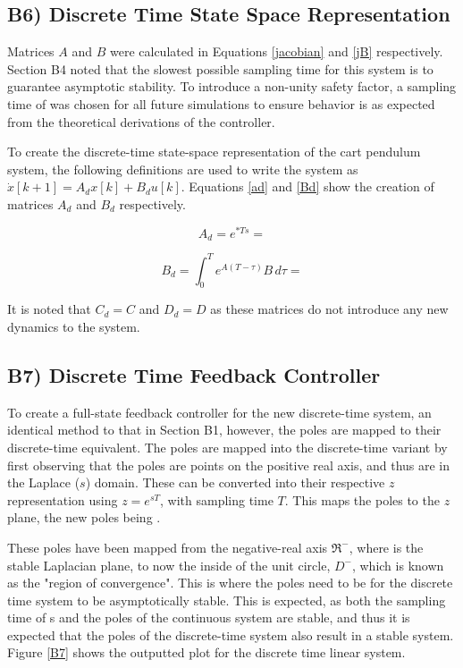 \documentclass{article}
\begin{document}
\subsection*{B6) Discrete Time State Space Representation}
Matrices $A$ and $B$ were calculated in Equations \ref{jacobian} and \ref{jB} respectively. Section B4 noted that the slowest possible sampling time for this system is to guarantee asymptotic stability. To introduce a non-unity safety factor, a sampling time of  was chosen for all future simulations to ensure behavior is as expected from the theoretical derivations of the controller.

To create the discrete-time state-space representation of the cart pendulum system, the following definitions are used to write the system as $\dot x[k+1]=A_dx[k]+B_du[k]$. Equations \ref{ad} and \ref{Bd} show the creation of matrices $A_d$ and $B_d$ respectively.

\begin{equation}\label{ad}
    A_d=e^{*Ts}=
\end{equation}


\begin{equation}\label{Bd}
    B_d=\int_{0}^{T} e^{A(T - \tau)} B \, d\tau=
\end{equation}

It is noted that $C_d=C$ and $D_d=D$ as these matrices do not introduce any new dynamics to the system.



\subsection*{B7) Discrete Time Feedback Controller}
To create a full-state feedback controller for the new discrete-time system, an identical method to that in Section B1, however, the poles are mapped to their discrete-time equivalent. The poles are mapped into the discrete-time variant by first observing that the poles are points on the positive real axis, and thus are in the Laplace ($s$) domain. These can be converted into their respective $z$ representation using $z=e^{sT}$, with sampling time $T$. This maps the poles to the $z$ plane, the new poles being . 
\newline

These poles have been mapped from the negative-real axis $\Re^-$, where is the stable Laplacian plane, to now the inside of the unit circle, $D^-$, which is known as the "region of convergence". This is where the poles need to be for the discrete time system to be asymptotically stable. This is expected, as both the sampling time of s and the poles of the continuous system are stable, and thus it is expected that the poles of the discrete-time system also result in a stable system. Figure \ref{B7} shows the outputted plot for the discrete time linear system.
\end{document}
